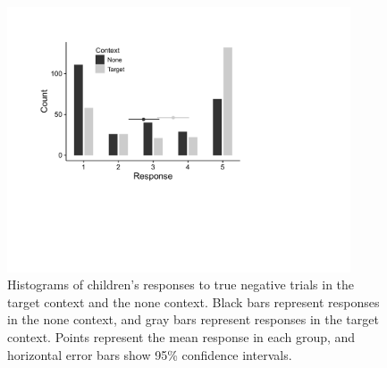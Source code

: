 \documentclass[man, noapacite]{apa2}
\begin{document}


\begin{figure}
\begin{center}
\includegraphics[width=4in]{figures/hist_all.pdf}
\caption{\label{fig:histograms} Histograms of children's responses to true negative trials in the target context and the none context. Black bars represent responses in the none context, and gray bars represent responses in the target context. Points represent the mean response in each group, and horizontal error bars show 95\% confidence intervals.}
\end{center}
\end{figure}
\end{document}
